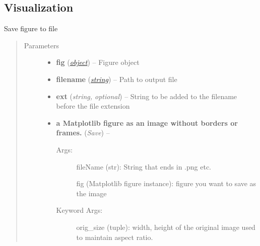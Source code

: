 \documentclass[letterpaper,10pt,english]{sphinxmanual}
\begin{document}
\subsection{Visualization}
\label{classification:visualization}\label{classification:module-flamingo.classification.plot}

\begin{fulllineitems}
\label{classification:flamingo.classification.plot.save_figure}
Save figure to file
\begin{quote}\begin{description}
\item[{Parameters}] \leavevmode\begin{itemize}
\item {} 
\textbf{fig} (\href{http://docs.python.org/library/functions.html\#object}{\emph{object}}) -- Figure object

\item {} 
\textbf{filename} (\href{http://docs.python.org/library/string.html\#module-string}{\emph{string}}) -- Path to output file

\item {} 
\textbf{ext} (\emph{string, optional}) -- String to be added to the filename before the file extension

\item {} 
\textbf{a Matplotlib figure as an image without borders or frames.} (\emph{Save}) -- \begin{description}
\item[{Args:}] \leavevmode
fileName (str): String that ends in .png etc.

fig (Matplotlib figure instance): figure you want to save as the image

\item[{Keyword Args:}] \leavevmode
orig\_size (tuple): width, height of the original image used to maintain
aspect ratio.

\end{description}


\end{itemize}

\end{description}\end{quote}

\end{fulllineitems}
\end{document}
